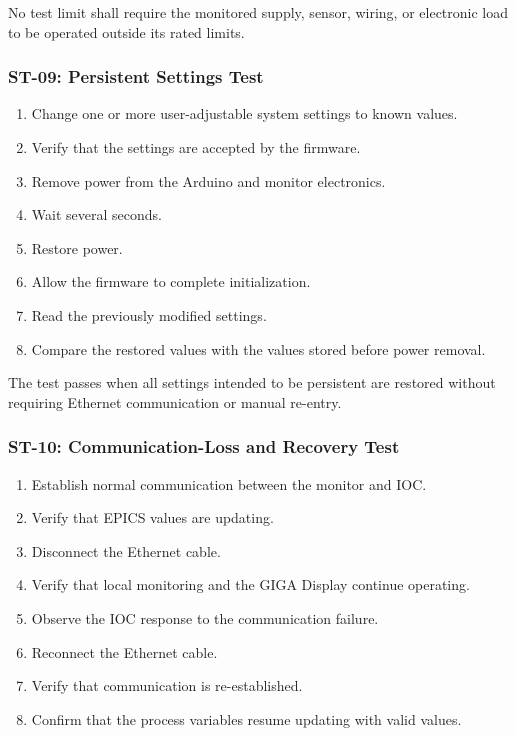 No test limit shall require the monitored supply, sensor, wiring, or electronic load
to be operated outside its rated limits.

\subsubsection{ST-09: Persistent Settings Test}

\begin{enumerate}
	\item Change one or more user-adjustable system settings to known values.
	\item Verify that the settings are accepted by the firmware.
	\item Remove power from the Arduino and monitor electronics.
	\item Wait several seconds.
	\item Restore power.
	\item Allow the firmware to complete initialization.
	\item Read the previously modified settings.
	\item Compare the restored values with the values stored before power removal.
\end{enumerate}

The test passes when all settings intended to be persistent are restored without
requiring Ethernet communication or manual re-entry.

\subsubsection{ST-10: Communication-Loss and Recovery Test}

\begin{enumerate}
	\item Establish normal communication between the monitor and IOC.
	\item Verify that EPICS values are updating.
	\item Disconnect the Ethernet cable.
	\item Verify that local monitoring and the GIGA Display continue operating.
	\item Observe the IOC response to the communication failure.
	\item Reconnect the Ethernet cable.
	\item Verify that communication is re-established.
	\item Confirm that the process variables resume updating with valid values.
\end{enumerate}

